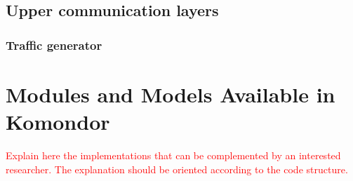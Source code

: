 \documentclass[a4paper]{article}
\begin{document}
%	
	
\subsection{Upper communication layers}

	\subsubsection{Traffic generator}


% 
\section{Modules and Models Available in Komondor}
\label{section:models}

\textcolor{red}{Explain here the implementations that can be complemented by an interested researcher. The explanation should be oriented according to the code structure.}
\end{document}
